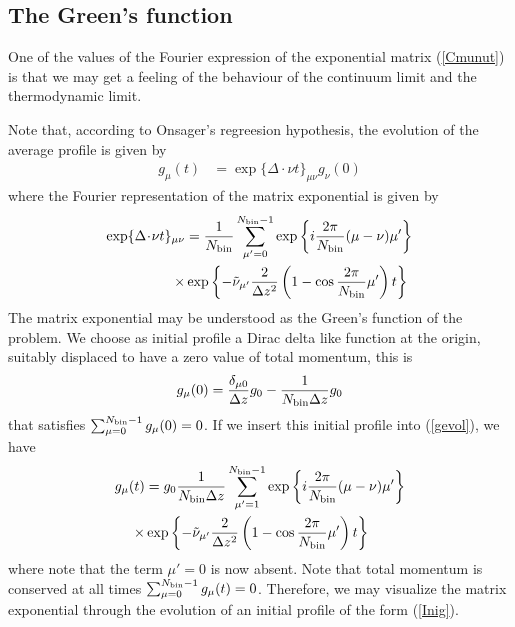 \documentclass[b5paper,openright,11pt]{book}
\newcommand{\esc}{\!\cdot\!}
\begin{document}
\begin{appendices}
\section{The Green's function}
One of the values of the  Fourier expression of the exponential matrix
(\ref{Cmunut}) is  that we may get  a feeling of the  behaviour of the
continuum limit and the thermodynamic  limit. 

Note that, according to Onsager's regreesion hypothesis, the evolution
of the average profile is given by 
\begin{align}
  g_\mu(t)&=\exp\{\Delta\esc\nu t\}_{\mu\nu}  g_\nu(0)
\label{gevol}
\end{align}
where the Fourier representation of the matrix exponential is given by
\begin{align}
  \exp\{\Delta\esc\nu t\}_{\mu\nu} &=
\frac{1}{{N_{\rm bin}}}\sum_{\mu'=0}^{{N_{\rm bin}}-1}\exp\left\{i\frac{2\pi}{{N_{\rm bin}}}(\mu-\nu)\mu'\right\}
\nonumber\\
\times&\exp\left\{-\tilde{\nu}_{\mu'}\frac{2}{\Delta z^2}\left(1-\cos\frac{2\pi}{{N_{\rm bin}}}\mu'\right)t\right\}
\end{align}
The matrix  exponential may be  understood as the Green's  function of
the problem.  We choose as initial  profile a Dirac delta like function at
the origin, suitably displaced to have a zero value of total momentum,
this is
\begin{align}
  g_\mu(0)=\frac{\delta_{\mu 0}}{\Delta z}g_0-\frac{1}{{N_{\rm bin}}\Delta z}g_0
\label{Inig}
\end{align}
that  satisfies  $\sum_{\mu=0}^{{N_{\rm bin}}-1}g_\mu(0)=0$.  If  we  insert  this
initial profile into (\ref{gevol}), we have
\begin{align}
  g_\mu(t)&=
g_0\frac{1}{{N_{\rm bin}}\Delta z}\sum_{\mu'=1}^{{N_{\rm bin}}-1}\exp\left\{i\frac{2\pi}{{N_{\rm bin}}}(\mu-\nu)\mu'\right\}
\nonumber\\
\times&\exp\left\{-\tilde{\nu}_{\mu'}\frac{2}{\Delta z^2}\left(1-\cos\frac{2\pi}{{N_{\rm bin}}}\mu'\right)t\right\}
\label{gmut}
\end{align}
where note  that the  term $\mu'=0$  is now  absent.  Note  that total
momentum   is   conserved    at   all   times   $\sum_{\mu=0}^{{N_{\rm
      bin}}-1}g_\mu(t)=0$.   Therefore, we  may  visualize the  matrix
exponential through  the evolution of  an initial profile of  the form
(\ref{Inig}).


\end{appendices}
\end{document}

